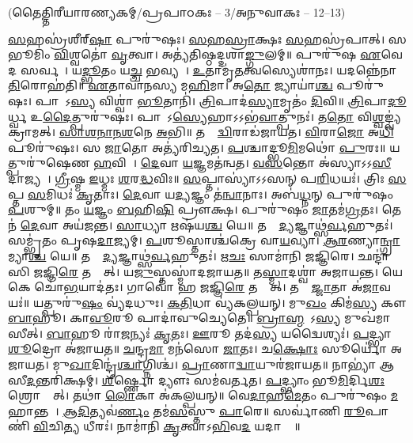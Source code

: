 
\centerline{\normalsize(𑌤𑍈𑌤𑍍𑌤𑌿𑌰𑍀𑌯𑌾𑌰𑌣𑍍𑌯𑌕𑌮𑍍/𑌪𑍍𑌰𑌪𑌾𑌠𑌕𑌃 – 3/𑌅𑌨𑍁𑌵𑌾𑌕𑌃 – 12--13)}

\ul{𑌸}𑌹𑌸𑍍𑌰॑𑌶𑍀𑌰𑍍‌\ul{𑌷𑌾} 𑌪𑍁𑌰𑍁॑𑌷𑌃। 
\ul{𑌸}\ul{𑌹}\ul{𑌸𑍍𑌰𑌾}𑌕𑍍𑌷𑌃 \ul{𑌸}𑌹𑌸𑍍𑌰॑𑌪𑌾𑌤𑍍। 
𑌸 𑌭𑍂𑌮𑌿𑌂॑ \ul{𑌵𑌿}𑌶𑍍𑌵𑌤𑍋॑ \ul{𑌵𑍃}𑌤𑍍𑌵𑌾। 
𑌅𑌤𑍍𑌯॑𑌤𑌿𑌷𑍍𑌠𑌦𑍍𑌦𑌶𑌾\ul{𑌙𑍍𑌗𑍁}𑌲𑌮𑍍॥ 
% 
𑌪𑍁𑌰𑍁॑𑌷 \ul{𑌏}𑌵𑍇𑌦 𑌸𑌰𑍍𑌵𑌮𑍍᳚। 
𑌯\ul{𑌦𑍍𑌭𑍂}𑌤𑌂 𑌯\ul{𑌚𑍍𑌚} 𑌭𑌵𑍍𑌯𑌮𑍍᳚। 
\ul{𑌉}𑌤𑌾𑌮𑍃॑\ul{𑌤}𑌤𑍍𑌵𑌸𑍍𑌯𑍇𑌶𑌾॑𑌨𑌃। 
𑌯𑌦𑌨𑍍𑌨𑍇॑𑌨𑌾\ul{𑌤𑌿}𑌰𑍋𑌹॑𑌤𑌿॥ 
% 
\ul{𑌏}𑌤𑌾𑌵𑌾॑𑌨𑌸𑍍𑌯 𑌮\ul{𑌹𑌿}𑌮𑌾। 
𑌅\ul{𑌤𑍋} 𑌜𑍍𑌯𑌾𑌯𑌾॑\ul{𑌶𑍍𑌚} 𑌪𑍂𑌰𑍁॑𑌷𑌃। 
𑌪𑌾𑌦𑍋᳚𑌽\ul{𑌸𑍍𑌯} 𑌵𑌿𑌶𑍍𑌵𑌾॑ \ul{𑌭𑍂}𑌤𑌾𑌨𑌿॑। 
\ul{𑌤𑍍𑌰𑌿}𑌪𑌾𑌦॑\ul{𑌸𑍍𑌯𑌾}𑌮𑍃𑌤𑌂॑ \ul{𑌦𑌿}𑌵𑌿॥ 
% 
\ul{𑌤𑍍𑌰𑌿}𑌪𑌾\ul{𑌦𑍂}𑌰𑍍𑌧𑍍𑌵 𑌉\ul{𑌦𑍈}𑌤𑍍𑌪𑍁𑌰𑍁॑𑌷𑌃। 
𑌪𑌾𑌦𑍋᳚𑌽\ul{𑌸𑍍𑌯𑍇}𑌹𑌾𑌽𑌽𑌭॑\ul{𑌵𑌾}𑌤𑍍𑌪𑍁𑌨𑌃॑। 
𑌤\ul{𑌤𑍋} 𑌵𑌿\ul{𑌶𑍍𑌵}𑌙𑍍𑌵𑍍𑌯॑𑌕𑍍𑌰𑌾𑌮𑌤𑍍। 
\ul{𑌸𑌾}\ul{𑌶}\ul{𑌨𑌾}\ul{𑌨}\ul{𑌶}𑌨𑍇 \ul{𑌅}𑌭𑌿॥ 
% 
𑌤𑌸𑍍𑌮𑌾᳚\ul{𑌦𑍍𑌵𑌿}𑌰𑌾𑌡॑𑌜𑌾𑌯𑌤। 
\ul{𑌵𑌿}𑌰𑌾\ul{𑌜𑍋} 𑌅\ul{𑌧𑌿} 𑌪𑍂𑌰𑍁॑𑌷𑌃। 
𑌸 \ul{𑌜𑌾}𑌤𑍋 𑌅𑌤𑍍𑌯॑𑌰𑌿𑌚𑍍𑌯𑌤। 
\ul{𑌪}𑌶𑍍𑌚𑌾𑌦𑍍𑌭𑍂\ul{𑌮𑌿}𑌮𑌥𑍋॑ \ul{𑌪𑍁}𑌰𑌃॥ 
% 
 𑌯𑌤𑍍𑌪𑍁𑌰𑍁॑𑌷𑍇𑌣 \ul{𑌹}𑌵𑌿𑌷𑌾᳚। 
\ul{𑌦𑍇}𑌵𑌾 \ul{𑌯}𑌜𑍍𑌞𑌮𑌤॑𑌨𑍍𑌵𑌤। 
\ul{𑌵}\ul{𑌸}𑌨𑍍𑌤𑍋 𑌅॑𑌸𑍍𑌯𑌾𑌽𑌽\ul{𑌸𑍀}𑌦𑌾𑌜𑍍𑌯𑌮𑍍᳚। 
\ul{𑌗𑍍𑌰𑍀}𑌷𑍍𑌮 \ul{𑌇}𑌧𑍍𑌮𑌃 \ul{𑌶}𑌰\ul{𑌦𑍍𑌧}𑌵𑌿𑌃॥ 
% 
 \ul{𑌸}𑌪𑍍𑌤𑌾𑌸𑍍𑌯𑌾॑𑌽𑌽𑌸𑌨𑍍  𑌪\ul{𑌰𑌿}𑌧𑌯𑌃॑। 
𑌤𑍍𑌰𑌿𑌃 \ul{𑌸}𑌪𑍍𑌤 \ul{𑌸}𑌮𑌿𑌧𑌃॑ \ul{𑌕𑍃}𑌤𑌾𑌃। 
\ul{𑌦𑍇}𑌵𑌾 𑌯\ul{𑌦𑍍𑌯}𑌜𑍍𑌞𑌂 𑌤॑\ul{𑌨𑍍𑌵𑌾}𑌨𑌾𑌃। 
𑌅𑌬॑\ul{𑌧𑍍𑌨}𑌨𑍍 𑌪𑍁𑌰𑍁॑𑌷𑌂 \ul{𑌪}𑌶𑍁𑌮𑍍॥ 
% 
 𑌤𑌂 \ul{𑌯}𑌜𑍍𑌞𑌂 \ul{𑌬}\ar 𑌹𑌿\ul{𑌷𑌿} 𑌪𑍍𑌰𑍗𑌕𑍍𑌷\sn। 
𑌪𑍁𑌰𑍁॑𑌷𑌂 \ul{𑌜𑌾}𑌤𑌮॑\ul{𑌗𑍍𑌰}𑌤𑌃। 
𑌤𑍇𑌨॑ \ul{𑌦𑍇}𑌵𑌾 𑌅𑌯॑𑌜𑌨𑍍𑌤। 
\ul{𑌸𑌾}𑌧𑍍𑌯𑌾 𑌋𑌷॑𑌯\ul{𑌶𑍍𑌚} 𑌯𑍇॥ 
% 
𑌤𑌸𑍍𑌮𑌾᳚\ul{𑌦𑍍𑌯}𑌜𑍍𑌞𑌾𑌥𑍍𑌸॑\ul{𑌰𑍍𑌵}𑌹𑍁𑌤𑌃॑। 
𑌸𑌮𑍍𑌭𑍃॑𑌤𑌂 𑌪𑍃𑌷\ul{𑌦𑌾}𑌜𑍍𑌯𑌮𑍍। 
\ul{𑌪}𑌶𑍂𑌸𑍍𑌤𑌾𑌶𑍍𑌚॑𑌕𑍍𑌰𑍇 𑌵𑌾\ul{𑌯}𑌵𑍍𑌯𑌾\sn{}। 
\ul{𑌆}\ul{𑌰}𑌣𑍍𑌯𑌾\ul{𑌨𑍍𑌗𑍍𑌰𑌾}𑌮𑍍𑌯𑌾\ul{𑌶𑍍𑌚} 𑌯𑍇॥ 
% 
 𑌤𑌸𑍍𑌮𑌾᳚\ul{𑌦𑍍𑌯}𑌜𑍍𑌞𑌾𑌥𑍍𑌸॑\ul{𑌰𑍍𑌵}𑌹𑍁𑌤𑌃॑। 
𑌋\ul{𑌚𑌃} 𑌸𑌾𑌮𑌾॑𑌨𑌿 𑌜𑌜𑍍𑌞𑌿𑌰𑍇। 
𑌛𑌨𑍍𑌦𑌾॑𑌸𑌿 𑌜𑌜𑍍𑌞𑌿\ul{𑌰𑍇} 𑌤𑌸𑍍𑌮𑌾᳚𑌤𑍍। 
𑌯\ul{𑌜𑍁}𑌸𑍍𑌤𑌸𑍍𑌮𑌾॑𑌦𑌜𑌾𑌯𑌤॥ 
% 
𑌤\ul{𑌸𑍍𑌮𑌾}𑌦𑌶𑍍𑌵𑌾॑ 𑌅𑌜𑌾𑌯𑌨𑍍𑌤। 
𑌯𑍇 𑌕𑍇 𑌚𑍋॑\ul{𑌭}𑌯𑌾𑌦॑𑌤𑌃। 
𑌗𑌾𑌵𑍋॑ 𑌹 𑌜𑌜𑍍𑌞𑌿\ul{𑌰𑍇} 𑌤𑌸𑍍𑌮𑌾᳚𑌤𑍍। 
𑌤𑌸𑍍𑌮𑌾᳚\ul{𑌜𑍍𑌜𑌾}𑌤𑌾 𑌅॑\ul{𑌜𑌾}𑌵𑌯𑌃॑॥ 
% 
𑌯𑌤𑍍𑌪𑍁𑌰𑍁॑\ul{𑌷𑌂} 𑌵𑍍𑌯॑𑌦𑌧𑍁𑌃। 
\ul{𑌕}\ul{𑌤𑌿}𑌧𑌾 𑌵𑍍𑌯॑𑌕𑌲𑍍𑌪𑌯𑌨𑍍। 
𑌮𑍁\ul{𑌖𑌂} 𑌕𑌿𑌮॑\ul{𑌸𑍍𑌯} 𑌕𑍗 \ul{𑌬𑌾}𑌹𑍂। 
𑌕𑌾\ul{𑌵𑍂}𑌰𑍂 𑌪𑌾𑌦𑌾॑𑌵𑍁𑌚𑍍𑌯𑍇𑌤𑍇॥ 
% 
\ul{𑌬𑍍𑌰𑌾}\ul{𑌹𑍍𑌮}𑌣𑍋᳚𑌽\ul{𑌸𑍍𑌯} 𑌮𑍁𑌖॑𑌮𑌾𑌸𑍀𑌤𑍍। 
\ul{𑌬𑌾}𑌹𑍂 𑌰𑌾॑\ul{𑌜}𑌨𑍍𑌯𑌃॑ \ul{𑌕𑍃}𑌤𑌃। 
\ul{𑌊}𑌰𑍂 𑌤𑌦॑\ul{𑌸𑍍𑌯} 𑌯𑌦𑍍𑌵𑍈𑌶𑍍𑌯𑌃॑। 
\ul{𑌪}𑌦𑍍𑌭𑍍𑌯𑌾 \ul{𑌶𑍂}𑌦𑍍𑌰𑍋 𑌅॑𑌜𑌾𑌯𑌤॥ 
% 
\ul{𑌚}𑌨𑍍𑌦𑍍𑌰\ul{𑌮𑌾} 𑌮𑌨॑𑌸𑍋 \ul{𑌜𑌾}𑌤𑌃। 
𑌚\ul{𑌕𑍍𑌷𑍋𑌃} 𑌸𑍂𑌰𑍍𑌯𑍋॑ 𑌅𑌜𑌾𑌯𑌤। 
𑌮𑍁\ul{𑌖𑌾}𑌦𑌿𑌨𑍍𑌦𑍍𑌰॑\ul{𑌶𑍍𑌚𑌾}𑌗𑍍𑌨𑌿𑌶𑍍𑌚॑। 
\ul{𑌪𑍍𑌰𑌾}𑌣𑌾\ul{𑌦𑍍𑌵𑌾}𑌯𑍁𑌰॑𑌜𑌾𑌯𑌤॥ 
% 
𑌨𑌾𑌭𑍍𑌯𑌾॑ 𑌆𑌸𑍀\ul{𑌦}𑌨𑍍𑌤𑌰𑌿॑𑌕𑍍𑌷𑌮𑍍। 
\ul{𑌶𑍀}𑌰𑍍𑌷𑍍𑌣𑍋 𑌦𑍍𑌯𑍗𑌃 𑌸𑌮॑𑌵𑌰𑍍𑌤𑌤। 
\ul{𑌪}𑌦𑍍𑌭𑍍𑌯𑌾𑌂 𑌭𑍂\ul{𑌮𑌿}𑌰𑍍𑌦𑌿\ul{𑌶𑌃} 𑌶𑍍𑌰𑍋𑌤𑍍𑌰𑌾᳚𑌤𑍍। 
𑌤𑌥𑌾॑ \ul{𑌲𑍋}𑌕𑌾 𑌅॑𑌕𑌲𑍍𑌪𑌯𑌨𑍍॥ 
% 
𑌵𑍇\ul{𑌦𑌾}𑌹\ul{𑌮𑍇}𑌤𑌂 𑌪𑍁𑌰𑍁॑𑌷𑌂 \ul{𑌮}𑌹𑌾𑌨𑍍𑌤𑌮𑍍᳚। 
\ul{𑌆}\ul{𑌦𑌿}𑌤𑍍𑌯𑌵॑\ul{𑌰𑍍𑌣𑌂} 𑌤𑌮॑\ul{𑌸}𑌸𑍍𑌤𑍁 \ul{𑌪𑌾}𑌰𑍇॥ 
% 
𑌸𑌰𑍍𑌵𑌾॑𑌣𑌿 \ul{𑌰𑍂}𑌪𑌾𑌣𑌿॑ \ul{𑌵𑌿}𑌚𑌿\ul{𑌤𑍍𑌯} 𑌧𑍀𑌰𑌃॑। 
𑌨𑌾𑌮𑌾॑𑌨𑌿 \ul{𑌕𑍃}𑌤𑍍𑌵𑌾𑌽\ul{𑌭𑌿}𑌵\ul{𑌦}\an{} 𑌯𑌦𑌾𑌸𑍍𑌤𑍇᳚॥ 
